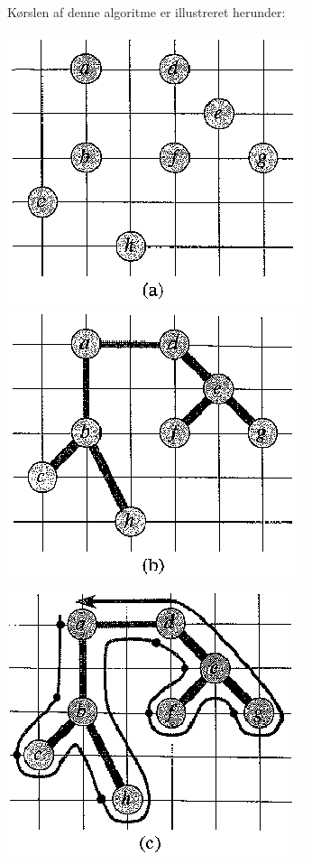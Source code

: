 Kørslen af denne algoritme er illustreret herunder:
\begin{center}
 \includegraphics[bb=0 0 247 226,scale=0.7]{./approxTSP1.png}
 \includegraphics[bb=0 0 247 226,scale=0.7]{./approxTSP2.png}
 \includegraphics[bb=0 0 247 226,scale=0.7]{./approxTSP3.png}

\end{center}
